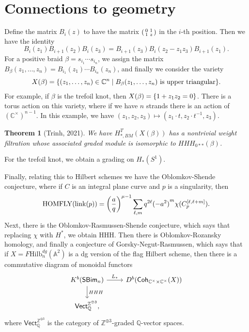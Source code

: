 \documentclass[leqno, openany]{memoir}
\newtheorem{thm}{Theorem}[section]
\theoremstyle{definition}
\theoremstyle{remark}
\theoremstyle{plain}
\theoremstyle{definition}
\theoremstyle{remark}
\newcommand{\A}{\mathbb{A}}
\newcommand{\C}{\mathbb{C}}
\newcommand{\Z}{\mathbb{Z}}
\newcommand{\Q}{\mathbb{Q}}
\newcommand{\mr}[1]{\mathrm{#1}}
\newcommand{\ms}[1]{\mathsf{#1}}
\newcommand{\1}{\mathbf{1}}
\newcommand{\2}{\mathbf{2}}
\newcommand{\3}{\mathbf{3}}
\begin{document}
\section{Connections to geometry}%
\label{sec:connections_to_geometry}

Define the matrix $B_i(z)$ to have the matrix $\begin{psmallmatrix}
    0 & 1 \\ 1 & z
\end{psmallmatrix}$ in the $i$-th position. Then we have the identity
\[ B_i(z_1) B_{i+1}(z_2) B_i(z_3) = B_{i+1}(z_3) B_i(z_2 - z_1 z_3) B_{i+1}(z_1). \]
For a positive braid $\beta = s_{i_1} \cdots s_{i_n}$, we assign the matrix $B_{\beta}(z_1, \ldots, z_n) = B_{i_1}(z_1) \cdots B_{i_n}(z_n)$, and finally we consider the variety 
\[ X(\beta) = \qty{(z_1, \ldots, z_n) \in \C^n \mid B_{\beta}(z_1, \ldots, z_n) \text{ is upper triangular}}. \]
For example, if $\beta$ is the trefoil knot, then $X(\beta) = \qty{1 + z_1 z_2 = 0}$. There is a torus action on this variety, where if we have $n$ strands there is an action of ${(\C^{\times})}^{n-1}$. In this example, we have $(z_1, z_2, z_3) \mapsto (z_1 \cdot t, z_2 \cdot t^{-1}, z_3)$.

\begin{thm}[Trinh, 2021]
    We have $H_{*,BM}^T(X(\beta))$ has a nontrivial weight filtration whose associated graded module is isomorphic to $HHH_{0**}(\beta)$.
\end{thm}

For the trefoil knot, we obtain a grading on $H_*(S^1)$.

Finally, relating this to Hilbert schemes we have the Oblomkov-Shende conjecture, where if $C$ is an integral plane curve and $p$ is a singularity, then
\[ \mr{HOMFLY}(\mr{link}(p)) = {\qty(\frac{a}{q})}^{\mu - 1} \sum_{\ell,m} q^{2\ell} {(-a^2)}^m \chi(C_p^{[\ell,\ell+m]}). \]
Next, there is the Oblomkov-Rasmussen-Shende conjecture, which says that replacing $\chi$ with $H^*$, we obtain HHH. Then there is Oblomkov-Rozansky homology, and finally a conjecture of Gorsky-Negut-Rasmussen, which says that if $X = F \mr{Hilb}_n^{dg}(\A^2)$ is a dg version of the flag Hilbert scheme, then there is a commutative diagram of monoidal functors
\begin{equation*}
\begin{tikzcd}
    K^b(\ms{SBim}_n) \ar{r}{L_*} \ar{d}{HHH} & D^b(\ms{Coh}_{\C^{\times} \times \C^{\times}}(X)) \\
    \ms{Vect}_{\Q}^{\Z^{\oplus 3}},
\end{tikzcd}
\end{equation*}
where $\ms{Vect}_{\Q}^{\Z^{\oplus 3}}$ is the category of $\Z^{\oplus 3}$-graded $\Q$-vector spaces.
\end{document}
